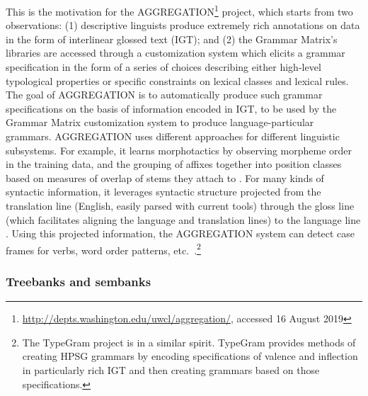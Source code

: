 \documentclass[output=paper,nonflat]{langsci/langscibook}
\begin{document}
This is the motivation for the AGGREGATION\footnote{\url{http://depts.washington.edu/uwcl/aggregation/}, accessed 16 August 2019}
project, which starts from two observations: (1) descriptive linguists
produce extremely rich annotations on data in the form of interlinear
glossed text (IGT); and (2) the Grammar Matrix's libraries are
accessed through a customization system which elicits a grammar
specification in the form of a series of choices describing either
high-level typological properties or specific constraints on lexical
classes and lexical rules.  The goal of AGGREGATION is to
automatically produce such grammar specifications on the basis of
information encoded in IGT, to be used by the Grammar Matrix
customization system to produce language-particular
grammars. AGGREGATION uses different approaches for different
linguistic subsystems. For example, it learns morphotactics by
observing morpheme order in the training data, and the grouping
of affixes together into position classes based on measures of overlap of
stems they attach to \citep{Wax:14,Zamaraeva:17}. For many kinds of
syntactic information, it leverages syntactic structure projected from
the translation line (English, easily parsed with current tools)
through the gloss line (which facilitates aligning the language and
translation lines) to the language line
\citep{Xia:Lew:07,Georgi:16}. Using this projected information, the
AGGREGATION system can detect case frames for verbs, word order
patterns, etc.\ \citep{Ben:Goo:Cro:Xia:13,Zam:How:Ben:19}.\footnote{The TypeGram project \citep{Hel:Bee:14} is in a similar spirit. TypeGram provides methods of creating HPSG grammars by encoding specifications of valence and inflection in particularly rich IGT and then creating grammars based on those specifications.}

\subsubsection{Treebanks and sembanks}
\label{cl:lang-doc:treebanks}
\end{document}
